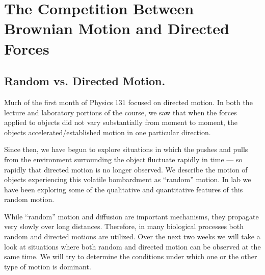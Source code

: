 \chapter{The Competition Between Brownian Motion and Directed Forces}
\thispagestyle{fancy}
\section{Random vs. Directed Motion.}
Much of the first month of Physics 131 focused on directed motion. In both the lecture and laboratory portions of the course, we saw that when the forces applied to objects did not vary substantially from moment to moment, the objects accelerated/established motion in one particular direction.
\par
Since then, we have begun to explore situations in which the pushes and pulls from the environment surrounding the object fluctuate rapidly in time — so rapidly that directed motion is no longer observed. 
We describe the motion of objects experiencing this volatile bombardment as ``random'' motion. 
In lab we have been exploring some of the qualitative and quantitative features of this random motion.
\par
While ``random'' motion and diffusion are important mechanisms, they propagate very slowly over long distances. 
Therefore, in many biological processes both random and directed motions are utilized. 
Over the next two weeks we will take a look at situations where both random and directed motion can be observed at the same time. 
We will try to determine the conditions under which one or the other type of motion is dominant.
